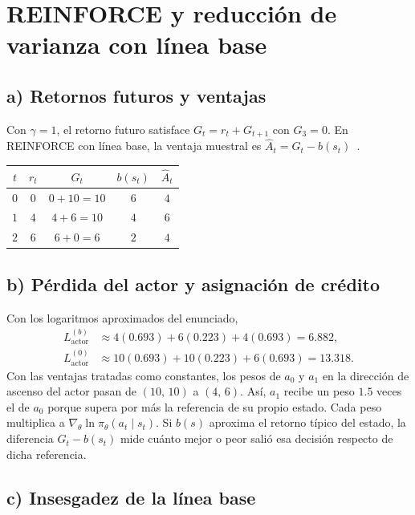 \section{REINFORCE y reducción de varianza con línea base}

\subsection*{a) Retornos futuros y ventajas}

Con $\gamma=1$, el retorno futuro satisface $G_t=r_t+G_{t+1}$ con $G_3=0$. En REINFORCE con línea base, la ventaja muestral es $\widehat A_t=G_t-b(s_t)$~\cite[seccs.~13.3--13.4]{sutton}.
\begin{center}
    \begin{tabular}{ccccc}
        \toprule
        $t$ & $r_t$ & $G_t$ & $b(s_t)$ & $\widehat A_t$ \\
        \midrule
        $0$ & $0$ & $0+10=10$ & $6$ & $4$ \\
        $1$ & $4$ & $4+6=10$ & $4$ & $6$ \\
        $2$ & $6$ & $6+0=6$  & $2$ & $4$ \\
        \bottomrule
    \end{tabular}
\end{center}

\subsection*{b) Pérdida del actor y asignación de crédito}

Con los logaritmos aproximados del enunciado,
\begin{align*}
    L_{\mathrm{actor}}^{(b)}
       &\approx 4(0.693)+6(0.223)+4(0.693)
         =\boxed{6.882},\\
    L_{\mathrm{actor}}^{(0)}
       &\approx 10(0.693)+10(0.223)+6(0.693)
         =13.318.
\end{align*}
Con las ventajas tratadas como constantes, los pesos de $a_0$ y $a_1$ en la dirección de ascenso del actor pasan de $(10,\,10)$ a $(4,\,6)$. Así, $a_1$ recibe un peso $1.5$ veces el de $a_0$ porque supera por más la referencia de su propio estado. Cada peso multiplica a $\nabla_\theta\ln\pi_\theta(a_t\mid s_t)$. Si $b(s)$ aproxima el retorno típico del estado, la diferencia $G_t-b(s_t)$ mide cuánto mejor o peor salió esa decisión respecto de dicha referencia.

\subsection*{c) Insesgadez de la línea base}

